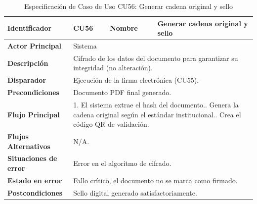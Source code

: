 \begingroup
\setlength{\parskip}{0pt}
\begin{longtable}{|p{3.5cm}|p{2cm}|p{2.5cm}|p{7cm}|}
\caption{Especificación de Caso de Uso CU56: Generar cadena original y sello}
\label{tab:cu56} \\
\hline
\textbf{Identificador} & CU56 & \textbf{Nombre} & Generar cadena original y sello \\ \hline
\textbf{Actor Principal} & \multicolumn{3}{p{11.5cm}|}{Sistema} \\ \hline
\textbf{Descripción} & \multicolumn{3}{p{11.5cm}|}{Cifrado de los datos del documento para garantizar su integridad (no alteración).} \\ \hline
\textbf{Disparador} & \multicolumn{3}{p{11.5cm}|}{Ejecución de la firma electrónica (CU55).} \\ \hline
\textbf{Precondiciones} & \multicolumn{3}{p{11.5cm}|}{Documento PDF final generado.} \\ \hline
\textbf{Flujo Principal} & \multicolumn{3}{p{11.5cm}|}{1. El sistema extrae el hash del documento.\newline 2. Genera la cadena original según el estándar institucional.\newline 3. Crea el código QR de validación.} \\ \hline
\textbf{Flujos Alternativos} & \multicolumn{3}{p{11.5cm}|}{N/A.} \\ \hline
\textbf{Situaciones de error} & \multicolumn{3}{p{11.5cm}|}{Error en el algoritmo de cifrado.} \\ \hline
\textbf{Estado en error} & \multicolumn{3}{p{11.5cm}|}{Fallo crítico, el documento no se marca como firmado.} \\ \hline
\textbf{Postcondiciones} & \multicolumn{3}{p{11.5cm}|}{Sello digital generado satisfactoriamente.} \\ \hline
\end{longtable}
\endgroup

\vspace{0.8cm}

